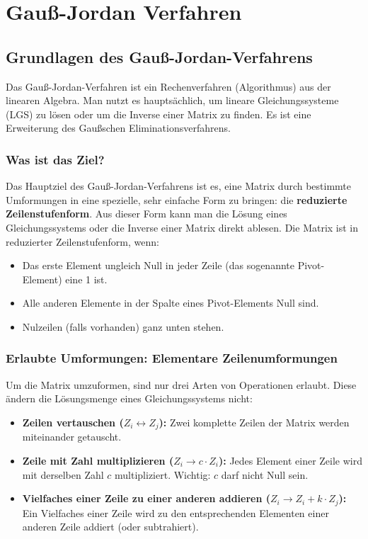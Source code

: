 \chapter{Gauß-Jordan Verfahren}
\label{gauss_jordan_verfahren}

\section{Grundlagen des Gauß-Jordan-Verfahrens}
Das Gauß-Jordan-Verfahren ist ein Rechenverfahren (Algorithmus) aus der
linearen Algebra. Man nutzt es hauptsächlich, um lineare Gleichungssysteme
(LGS) zu lösen oder um die Inverse einer Matrix zu finden. Es ist eine
Erweiterung des Gaußschen Eliminationsverfahrens.

\subsection{Was ist das Ziel?}
Das Hauptziel des Gauß-Jordan-Verfahrens ist es, eine Matrix durch bestimmte
Umformungen in eine spezielle, sehr einfache Form zu bringen: die
\textbf{reduzierte Zeilenstufenform}. Aus dieser Form kann man die Lösung eines
Gleichungssystems oder die Inverse einer Matrix direkt ablesen. Die Matrix ist
in reduzierter Zeilenstufenform, wenn:
\begin{itemize}
    \item Das erste Element ungleich Null in jeder Zeile (das sogenannte Pivot-Element)
          eine 1 ist.
    \item Alle anderen Elemente in der Spalte eines Pivot-Elements Null sind.
    \item Nulzeilen (falls vorhanden) ganz unten stehen.
\end{itemize}

\subsection{Erlaubte Umformungen: Elementare Zeilenumformungen}
Um die Matrix umzuformen, sind nur drei Arten von Operationen erlaubt. Diese
ändern die Lösungsmenge eines Gleichungssystems nicht:
\begin{itemize}
    \item \textbf{Zeilen vertauschen ($Z_i \leftrightarrow Z_j$):} Zwei komplette Zeilen der Matrix werden miteinander getauscht.
    \item \textbf{Zeile mit Zahl multiplizieren ($Z_i \rightarrow c \cdot Z_i$):} Jedes Element einer Zeile wird mit derselben Zahl $c$ multipliziert. Wichtig: $c$ darf nicht Null sein.
    \item \textbf{Vielfaches einer Zeile zu einer anderen addieren ($Z_i \rightarrow Z_i + k \cdot Z_j$):} Ein Vielfaches einer Zeile wird zu den entsprechenden Elementen einer anderen Zeile addiert (oder subtrahiert).
\end{itemize}


